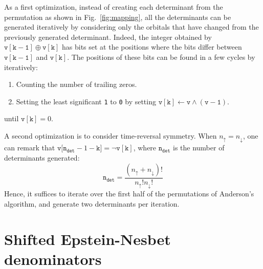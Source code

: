 \documentclass[aip,jcp,reprint,showkeys]{revtex4-1}
\newcommand{\up}{\uparrow}
\newcommand{\dn}{\downarrow}
\newcommand{\one}{{\texttt{1}}}
\newcommand{\zero}{{\texttt{0}}}
\begin{document}
As a first optimization, instead of creating each determinant from the
permutation as shown in Fig.~\ref{fig:mapping}, all the determinants can be
generated iteratively by considering only the orbitals that have changed
from the previously generated determinant.
Indeed, the integer obtained by $\mathtt{v[k-1]} \oplus \mathtt{v[k]}$ has bits set at the positions where the bits differ between $\mathtt{v[k-1]}$ and
$\mathtt{v[k]}$. The positions of these bits can be found in a few cycles by
iteratively:
\begin{enumerate}
\item Counting the number of trailing zeros.
\item Setting the least significant {\one} to {\zero} by setting
      $\mathtt{v[k] \gets v \wedge (v-1)}$.
\end{enumerate}
until $\mathtt{v[k]} = 0$. 

A second optimization is to consider time-reversal symmetry. When $n_\up =
n_\dn$, one can remark that ${\mathtt{v[n_{det}}-1-\mathtt{k]} = \neg \mathtt{v[k]}}$, 
where $\mathtt{n_{det}}$ is the number of determinants generated:
\begin{equation}
\mathtt{n_{det}} = \frac{(n_\up +n_\dn)!}{n_\up! n_\dn!}
\end{equation}
Hence, it suffices to iterate over the first half of the permutations of Anderson's
algorithm, and generate two determinants per iteration.


\section{Shifted Epstein-Nesbet denominators}
\end{document}

